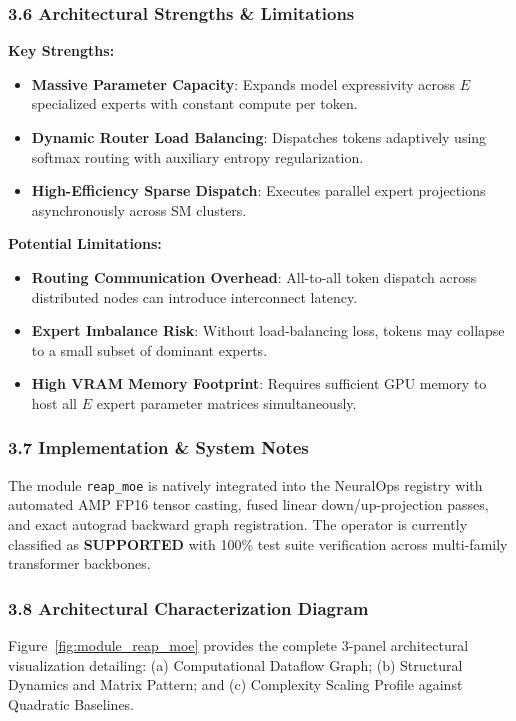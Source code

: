 \subsubsection*{3.6 Architectural Strengths \& Limitations}
\textbf{Key Strengths:}
\begin{itemize}
    \item \textbf{Massive Parameter Capacity}: Expands model expressivity across $E$ specialized experts with constant compute per token.
    \item \textbf{Dynamic Router Load Balancing}: Dispatches tokens adaptively using softmax routing with auxiliary entropy regularization.
    \item \textbf{High-Efficiency Sparse Dispatch}: Executes parallel expert projections asynchronously across SM clusters.
\end{itemize}

\textbf{Potential Limitations:}
\begin{itemize}
    \item \textbf{Routing Communication Overhead}: All-to-all token dispatch across distributed nodes can introduce interconnect latency.
    \item \textbf{Expert Imbalance Risk}: Without load-balancing loss, tokens may collapse to a small subset of dominant experts.
    \item \textbf{High VRAM Memory Footprint}: Requires sufficient GPU memory to host all $E$ expert parameter matrices simultaneously.
\end{itemize}

\subsubsection*{3.7 Implementation \& System Notes}
The module \texttt{reap\_moe} is natively integrated into the NeuralOps registry with automated AMP FP16 tensor casting, fused linear down/up-projection passes, and exact autograd backward graph registration. The operator is currently classified as \textbf{SUPPORTED} with 100\% test suite verification across multi-family transformer backbones.

\subsubsection*{3.8 Architectural Characterization Diagram}
Figure~\ref{fig:module_reap_moe} provides the complete 3-panel architectural visualization detailing: (a) Computational Dataflow Graph; (b) Structural Dynamics and Matrix Pattern; and (c) Complexity Scaling Profile against Quadratic Baselines.

